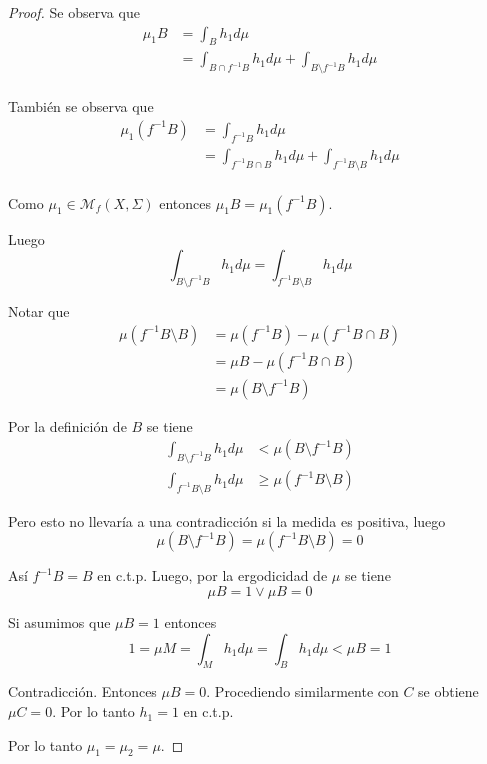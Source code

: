 \begin{proof}
	Se observa que
	\begin{align}
		\mu_1 B &= \int_B h_1 d\mu\\
		&= \int_{B \cap f^{-1}B} h_1 d\mu + \int_{B \setminus f^{-1}B} h_1 d\mu\\
	\end{align}
	
	También se observa que
	\begin{align}
		\mu_1(f^{-1}B) &= \int_{f^{-1}B} h_1 d\mu\\
		&= \int_{f^{-1}B \cap B} h_1 d\mu + \int_{f^{-1}B \setminus B} h_1 d\mu\\
	\end{align}
	
	Como $\mu_1 \in \mathcal{M}_f(X,\Sigma)$ entonces $\mu_1 B = \mu_1(f^{-1}B)$.
	
	Luego
	\begin{equation}
		\int_{B \setminus f^{-1}B} h_1 d\mu = \int_{f^{-1}B \setminus B} h_1 d\mu
	\end{equation}
	
	Notar que
	\begin{align}
		\mu(f^{-1}B \setminus B) &= \mu(f^{-1}B) - \mu(f^{-1}B \cap B)\\
		&= \mu B - \mu(f^{-1}B \cap B)\\
		&= \mu(B \setminus f^{-1}B)
	\end{align}
	
	Por la definición de $B$ se tiene
	\begin{align}
		\int_{B \setminus f^{-1}B} h_1 d\mu &< \mu(B \setminus f^{-1}B)\\
		\int_{f^{-1}B \setminus B} h_1 d\mu &\geq \mu(f^{-1}B \setminus B)
	\end{align}
	
	Pero esto no llevaría a una contradicción si la medida es positiva, luego
	\begin{equation}
		\mu(B \setminus f^{-1}B) = \mu(f^{-1}B \setminus B) = 0
	\end{equation}
	
	Así $f^{-1}B=B$ en c.t.p. Luego, por la ergodicidad de $\mu$ se tiene
	\begin{equation}
		\mu B = 1 \vee \mu B = 0
	\end{equation}
	
	Si asumimos que $\mu B = 1$ entonces
	\begin{equation}
		1 = \mu M = \int_M h_1 d\mu = \int_B h_1 d\mu < \mu B = 1
	\end{equation}
	
	Contradicción. Entonces $\mu B = 0$. Procediendo similarmente con $C$ se obtiene $\mu C = 0$. Por lo tanto $h_1 = 1$ en c.t.p.
	
	Por lo tanto $\mu_1=\mu_2=\mu$.
\end{proof}

